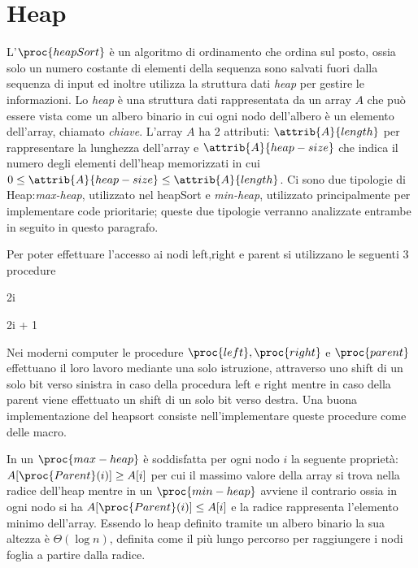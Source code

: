 \chapter{Heap}
L'$\proc{heapSort}$ è un algoritmo di ordinamento che ordina sul posto, ossia solo un numero costante di elementi della sequenza
sono salvati fuori dalla sequenza di input ed inoltre utilizza la struttura dati \emph{heap} per gestire le informazioni.\newline
Lo \emph{heap} è una struttura dati rappresentata da un array $A$ che può essere vista come un albero binario
in cui ogni nodo dell'albero è un elemento dell'array, chiamato \emph{chiave}.\newline
L'array $A$ ha 2 attributi: $\attrib{A}{length}$ per rappresentare la lunghezza dell'array
e $\attrib{A}{heap-size}$ che indica il numero degli elementi dell'heap memorizzati in cui $0 \leq \attrib{A}{heap-size} \leq \attrib{A}{length}$.\newline 
Ci sono due tipologie di Heap:\emph{max-heap}, utilizzato nel heapSort e \emph{min-heap}, utilizzato principalmente per implementare code prioritarie;
queste due tipologie verranno analizzate entrambe in seguito in questo paragrafo.


Per poter effettuare l'accesso ai nodi left,right e parent si utilizzano le seguenti 3 procedure
\begin{codebox}
    \li \Return 2i 
\end{codebox}
\begin{codebox}
    \li \Return 2i + 1
\end{codebox}
\begin{codebox}
    \li \Return \cfloor {} \rfloor 
\end{codebox}

Nei moderni computer le procedure $\proc{left}, \proc{right}$ e $\proc{parent}$ effettuano il loro lavoro mediante una solo istruzione, attraverso uno shift di un solo bit
verso sinistra in caso della procedura left e right mentre in caso della parent viene effettuato un shift di un solo bit verso destra.\newline
Una buona implementazione del heapsort consiste nell'implementare queste procedure come delle macro.

In un $\proc{max-heap}$ è soddisfatta per ogni nodo $i$ la seguente proprietà:
$A[\proc{Parent}(i)] \geq A[i]$ per cui il massimo valore della array si trova nella radice dell'heap mentre in un $\proc{min-heap}$ avviene il contrario 
ossia in ogni nodo si ha $A[\proc{Parent}(i)] \leq A[i]$ e la radice rappresenta l'elemento minimo dell'array.\newline
Essendo lo heap definito tramite un albero binario la sua altezza è $\Theta(\log n)$, definita come il più lungo percorso per raggiungere i nodi foglia a partire dalla radice.


